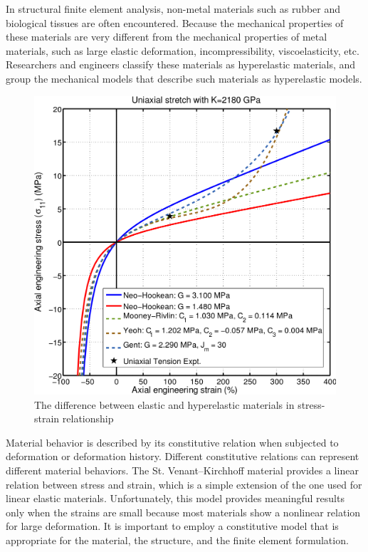 In structural finite element analysis, non-metal materials such as rubber and biological tissues are often encountered. Because the mechanical properties of these materials are very different from the mechanical properties of metal materials, such as large elastic deformation, incompressibility, viscoelasticity, etc. Researchers and engineers classify these materials as hyperelastic materials, and group the mechanical models that describe such materials as hyperelastic models.
\begin{figure}[H]
    \centering
    \includegraphics[scale=0.35]{Figure2/Chap3/diffhyper.png}
    \caption{The difference between elastic and hyperelastic materials in stress-strain relationship}
    \label{fig:my_label}
\end{figure}

Material behavior is described by its constitutive
relation when subjected to deformation or deformation history. Different constitutive relations can represent different material behaviors. The St. Venant–Kirchhoff
material provides a linear relation between stress and strain, which is a
simple extension of the one used for linear elastic materials. Unfortunately, this
model provides meaningful results only when the strains are small because most
materials show a nonlinear relation for large deformation. It is important to employ
a constitutive model that is appropriate for the material, the structure, and the ﬁnite
element formulation.

